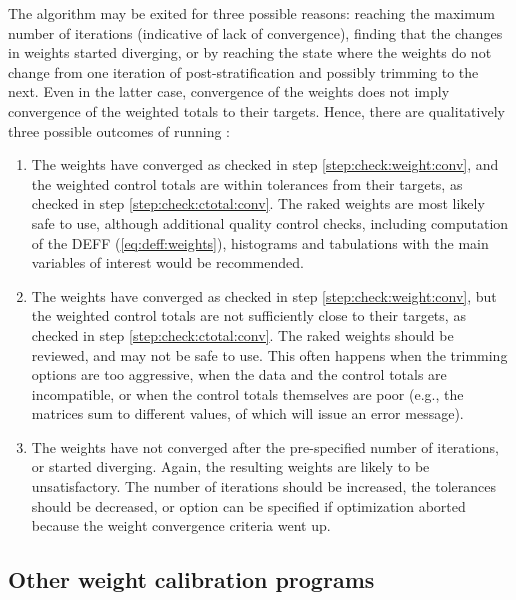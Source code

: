 The algorithm may be exited for three possible reasons: reaching
the maximum number of iterations (indicative of lack of convergence),
finding that the changes in weights started diverging,
or by reaching the state where the weights do not change from one iteration
of post-stratification and possibly trimming to the next. Even in the latter
case, convergence of the weights does not imply convergence of the weighted
totals to their targets. Hence, there are qualitatively three possible
outcomes of running :
\begin{enumerate}
    \item The weights have converged as checked in step
         \ref{step:check:weight:conv}, and the weighted control totals
         are within tolerances from their targets, as checked in
         step \ref{step:check:ctotal:conv}. The raked weights
         are most likely safe to use, although additional quality control checks,
         including computation of the DEFF (\ref{eq:deff:weights}),
         histograms and tabulations with the main variables of interest 
         would be recommended.
    \item The weights have converged as checked in step
         \ref{step:check:weight:conv}, but the weighted control totals
         are not sufficiently close to their targets, as checked in
         step \ref{step:check:ctotal:conv}. The raked weights
         should be reviewed, and may not be safe to use.
         This often happens when the trimming options are
         too aggressive, when the data and the control totals
         are incompatible, or when the control totals themselves
         are poor (e.g., the matrices sum to different values,
         of which  will issue an error message).
    \item The weights have not converged after the pre-specified number
        of iterations, or started diverging. Again, the resulting weights
        are likely to be unsatisfactory. The number of iterations should
        be increased, the tolerances should be decreased, or
         option can be specified if optimization aborted
        because the weight convergence criteria went up.
\end{enumerate}

\subsection{Other weight calibration programs}

